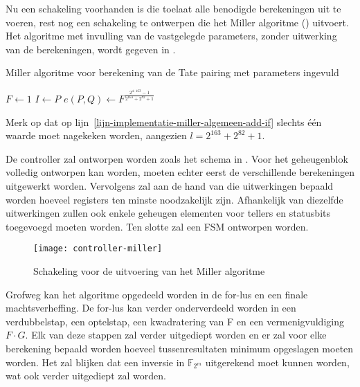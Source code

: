 Nu een schakeling voorhanden is die toelaat alle benodigde berekeningen uit te voeren, rest nog een schakeling te ontwerpen die het Miller algoritme () uitvoert. Het algoritme met invulling van de vastgelegde parameters, zonder uitwerking van de berekeningen, wordt gegeven in .

\begin{algorithm}[h]
	\caption{Miller algoritme voor berekening van de Tate pairing met parameters ingevuld}
	\label{algoritme-implementatie-miller-algemeen}
	$F \leftarrow 1$\;
	$I \leftarrow P$\;
	$e(P, Q) \leftarrow F^{\frac{2^{4 \cdot 163} - 1}{2^{163} + 2^{82} + 1}}$\;
\end{algorithm}

Merk op dat op lijn~\ref{lijn-implementatie-miller-algemeen-add-if} slechts \'e\'en waarde moet nagekeken worden, aangezien $l = 2^{163} + 2^{82} + 1$.

De controller zal ontworpen worden zoals het schema in . Voor het geheugenblok volledig ontworpen kan worden, moeten echter eerst de verschillende berekeningen uitgewerkt worden. Vervolgens zal aan de hand van die uitwerkingen bepaald worden hoeveel registers ten minste noodzakelijk zijn. Afhankelijk van diezelfde uitwerkingen zullen ook enkele geheugen elementen voor tellers en statusbits toegevoegd moeten worden. Ten slotte zal een FSM ontworpen worden.

\begin{figure}[h]
	\centering
		\texttt{[image: controller-miller]}
		\caption{Schakeling voor de uitvoering van het Miller algoritme\label{figuur-implementatie-miller-controller}}
\end{figure}

Grofweg kan het algoritme opgedeeld worden in de for-lus  en een finale machtsverheffing. De for-lus kan verder onderverdeeld worden in een verdubbelstap, een optelstap, een kwadratering van F en een vermenigvuldiging $F \cdot G$. Elk van deze stappen zal verder uitgediept worden en er zal voor elke berekening bepaald worden hoeveel tussenresultaten minimum opgeslagen moeten worden. Het zal blijken dat een inversie in $\mathbb{F}_{2^m}$ uitgerekend moet kunnen worden, wat ook verder uitgediept zal worden.

